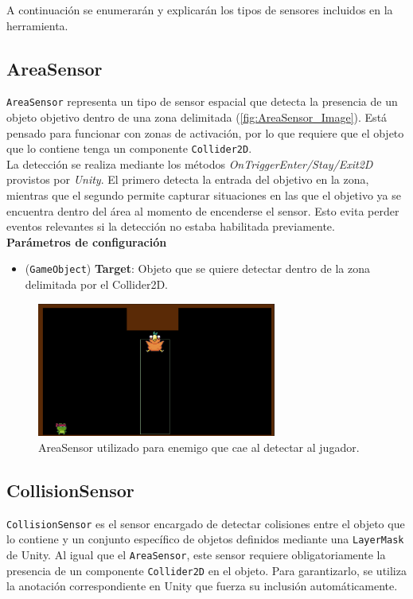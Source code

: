 A continuación se enumerarán y explicarán los tipos de sensores incluidos en la herramienta.\\

\subsection{AreaSensor}

\texttt{AreaSensor} representa un tipo de sensor espacial que detecta la presencia de un objeto objetivo dentro de una zona delimitada (\autoref{fig:AreaSensor_Image}). Está pensado para funcionar con zonas de activación, por lo que requiere que el objeto que lo contiene tenga un componente \texttt{Collider2D}.\\

La detección se realiza mediante los métodos \textit{OnTriggerEnter/Stay/Exit2D} provistos por \textit{Unity}. 
El primero detecta la entrada del objetivo en la zona, mientras que el segundo permite capturar situaciones en las que el objetivo ya se encuentra dentro del área al momento de encenderse el sensor. Esto evita perder eventos relevantes si la detección no estaba habilitada previamente.\\

\textbf{Parámetros de configuración}
\begin{itemize}
	\item (\texttt{GameObject}) \textbf{Target}: Objeto que se quiere detectar dentro de la zona delimitada por el Collider2D.
\end{itemize}

\begin{figure}[t]
		\centering
		\includegraphics[width = 0.7\textwidth]{Imagenes/AreaSensor_Image.png}
		\caption{AreaSensor utilizado para enemigo que cae al detectar al jugador.}
		\label{fig:AreaSensor_Image}
\end{figure}
\subsection{CollisionSensor}
\texttt{CollisionSensor} es el sensor encargado de detectar colisiones entre el objeto que lo contiene y un conjunto específico de objetos definidos mediante una \texttt{LayerMask} de Unity. Al igual que el \texttt{AreaSensor}, este sensor requiere obligatoriamente la presencia de un componente \texttt{Collider2D} en el objeto. Para garantizarlo, se utiliza la anotación correspondiente en Unity que fuerza su inclusión automáticamente.\\


